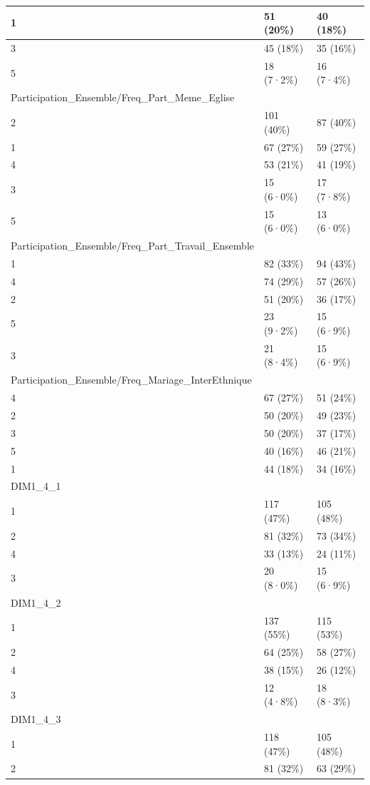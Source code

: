 \documentclass[
]{book}
\begin{document}
\begin{tabular}{l|l|l}
\hline
1 & 51 (20\%) & 40 (18\%)\\
\hline
3 & 45 (18\%) & 35 (16\%)\\
\hline
5 & 18 (7·2\%) & 16 (7·4\%)\\
\hline
Participation\_Ensemble/Freq\_Part\_Meme\_Eglise &  & \\
\hline
2 & 101 (40\%) & 87 (40\%)\\
\hline
1 & 67 (27\%) & 59 (27\%)\\
\hline
4 & 53 (21\%) & 41 (19\%)\\
\hline
3 & 15 (6·0\%) & 17 (7·8\%)\\
\hline
5 & 15 (6·0\%) & 13 (6·0\%)\\
\hline
Participation\_Ensemble/Freq\_Part\_Travail\_Ensemble &  & \\
\hline
1 & 82 (33\%) & 94 (43\%)\\
\hline
4 & 74 (29\%) & 57 (26\%)\\
\hline
2 & 51 (20\%) & 36 (17\%)\\
\hline
5 & 23 (9·2\%) & 15 (6·9\%)\\
\hline
3 & 21 (8·4\%) & 15 (6·9\%)\\
\hline
Participation\_Ensemble/Freq\_Mariage\_InterEthnique &  & \\
\hline
4 & 67 (27\%) & 51 (24\%)\\
\hline
2 & 50 (20\%) & 49 (23\%)\\
\hline
3 & 50 (20\%) & 37 (17\%)\\
\hline
5 & 40 (16\%) & 46 (21\%)\\
\hline
1 & 44 (18\%) & 34 (16\%)\\
\hline
DIM1\_4\_1 &  & \\
\hline
1 & 117 (47\%) & 105 (48\%)\\
\hline
2 & 81 (32\%) & 73 (34\%)\\
\hline
4 & 33 (13\%) & 24 (11\%)\\
\hline
3 & 20 (8·0\%) & 15 (6·9\%)\\
\hline
DIM1\_4\_2 &  & \\
\hline
1 & 137 (55\%) & 115 (53\%)\\
\hline
2 & 64 (25\%) & 58 (27\%)\\
\hline
4 & 38 (15\%) & 26 (12\%)\\
\hline
3 & 12 (4·8\%) & 18 (8·3\%)\\
\hline
DIM1\_4\_3 &  & \\
\hline
1 & 118 (47\%) & 105 (48\%)\\
\hline
2 & 81 (32\%) & 63 (29\%)\\

\end{tabular}
\end{document}
